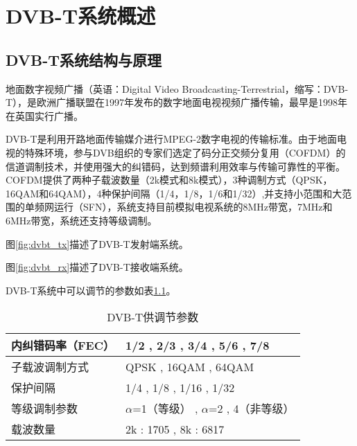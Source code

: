 \chapter{DVB-T系统概述}
	\section{DVB-T系统结构与原理}
		\par 地面数字视频广播（英语：Digital Video Broadcasting-Terrestrial，缩写：DVB-T），是欧洲广播联盟在1997年发布的数字地面电视视频广播传输，最早是1998年在英国实行广播。\cite{ wiki:DVB-T}\cite{what_is_dvb_t}
		\par DVB-T是利用开路地面传输媒介进行MPEG-2数字电视的传输标准。由于地面电视的特殊环境，参与DVB组织的专家们选定了码分正交频分复用（COFDM）的信道调制技术，并使用强大的纠错码，达到频谱利用效率与传输可靠性的平衡。COFDM提供了两种子载波数量（2k模式和8k模式），3种调制方式（QPSK，16QAM和64QAM），4种保护间隔（1/4，1/8，1/6和1/32）,并支持小范围和大范围的单频网运行（SFN），系统支持目前模拟电视系统的8MHz带宽，7MHz和6MHz带宽，系统还支持等级调制。
		\par 图\ref{fig:dvbt_tx}描述了DVB-T发射端系统。
		
		\par 图\ref{fig:dvbt_rx}描述了DVB-T接收端系统。
		
		\par DVB-T系统中可以调节的参数如表\ref{table:params_of_dvbt}。
		\begin{table}[!htb]
			\centering
			\caption{DVB-T供调节参数}
			\begin{tabular}{l|p{}}
				\hline\hline
				内纠错码率（FEC） & 1/2 , 2/3 , 3/4 , 5/6 , 7/8                            \\
				\hline
				子载波调制方式    & QPSK , 16QAM , 64QAM                                   \\
				\hline
				保护间隔             & 1/4 , 1/8 , 1/16 , 1/32                                \\
				\hline
				等级调制参数       & $\alpha$=1（等级） , $\alpha$=2 , 4（非等级） \\
				\hline
				载波数量             & 2k : 1705 , 8k : 6817                                  \\
				\hline\hline
			\end{tabular}
			\label{table:params_of_dvbt}
		\end{table}
		\endinput